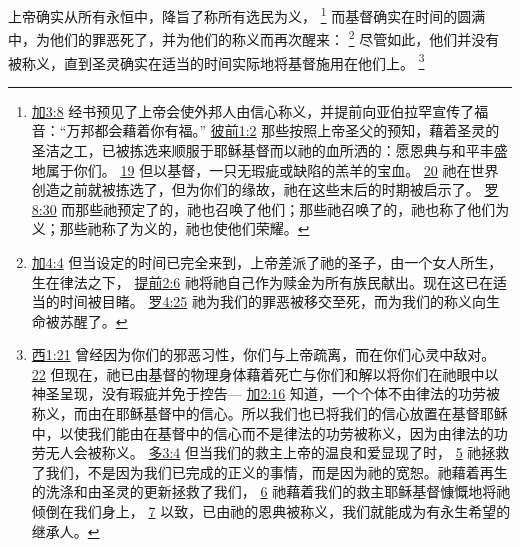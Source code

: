 \documentclass[12pt, a4paper, oneside]{ctexart}
\newcounter{parnum}[section]
\newcommand{\N}{%
   \noindent\refstepcounter{parnum}%
    \makebox[\parindent][l]{\textbf{\arabic{parnum}.}}}
\begin{document}
\N 上帝确实从所有永恒中，降旨了称所有选民为义，
	\footnote {
		\href{https://biblehub.com/galatians/3-8.htm}{加3:8} 经书预见了上帝会使外邦人由信心称义，并提前向亚伯拉罕宣传了福音：“万邦都会藉着你有福。”
		\href{https://biblehub.com/1_peter/1-2.htm}{彼前1:2} 那些按照上帝圣父的预知，藉着圣灵的圣洁之工，已被拣选来顺服于耶稣基督而以祂的血所洒的：愿恩典与和平丰盛地属于你们。
		\href{https://biblehub.com/1_peter/1-19.htm}{19} 但以基督，一只无瑕疵或缺陷的羔羊的宝血。
		\href{https://biblehub.com/1_peter/1-20.htm}{20} 祂在世界创造之前就被拣选了，但为你们的缘故，祂在这些末后的时期被启示了。
		\href{https://biblehub.com/romans/8-30.htm}{罗8:30} 而那些祂预定了的，祂也召唤了他们；那些祂召唤了的，祂也称了他们为义；那些祂称了为义的，祂也使他们荣耀。
	}
	而基督确实在时间的圆满中，为他们的罪恶死了，并为他们的称义而再次醒来：
	\footnote {
		\href{https://biblehub.com/galatians/4-4.htm}{加4:4} 但当设定的时间已完全来到，上帝差派了祂的圣子，由一个女人所生，生在律法之下，
		\href{https://biblehub.com/1_timothy/2-6.htm}{提前2:6} 祂将祂自己作为赎金为所有族民献出。现在这已在适当的时间被目睹。
		\href{https://biblehub.com/romans/4-25.htm}{罗4:25} 祂为我们的罪恶被移交至死，而为我们的称义向生命被苏醒了。
	}
	尽管如此，他们并没有被称义，直到圣灵确实在适当的时间实际地将基督施用在他们上。
	\footnote {
		\href{https://biblehub.com/colossians/1-21.htm}{西1:21} 曾经因为你们的邪恶习性，你们与上帝疏离，而在你们心灵中敌对。
		\href{https://biblehub.com/colossians/1-22.htm}{22} 但现在，祂已由基督的物理身体藉着死亡与你们和解以将你们在祂眼中以神圣呈现，没有瑕疵并免于控告---
		\href{https://biblehub.com/galatians/2-16.htm}{加2:16} 知道，一个个体不由律法的功劳被称义，而由在耶稣基督中的信心。所以我们也已将我们的信心放置在基督耶稣中，以使我们能由在基督中的信心而不是律法的功劳被称义，因为由律法的功劳无人会被称义。
		\href{https://biblehub.com/titus/3-4.htm}{多3:4} 但当我们的救主上帝的温良和爱显现了时，
		\href{https://biblehub.com/titus/3-5.htm}{5} 祂拯救了我们，不是因为我们已完成的正义的事情，而是因为祂的宽恕。祂藉着再生的洗涤和由圣灵的更新拯救了我们，
		\href{https://biblehub.com/titus/3-6.htm}{6} 祂藉着我们的救主耶稣基督慷慨地将祂倾倒在我们身上，
		\href{https://biblehub.com/titus/3-7.htm}{7} 以致，已由祂的恩典被称义，我们就能成为有永生希望的继承人。
	}
\end{document}
